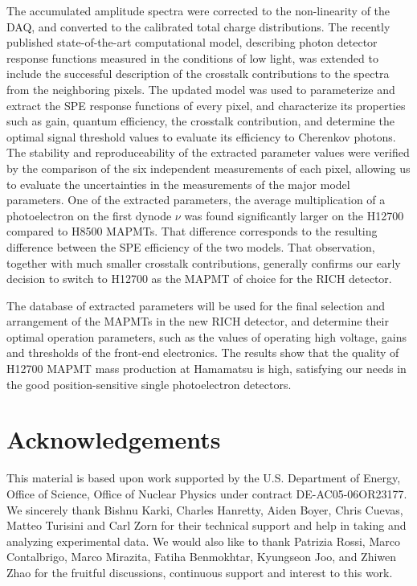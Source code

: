 The accumulated amplitude spectra were corrected to the non-linearity of the DAQ, and converted to the calibrated total charge distributions. The recently published state-of-the-art computational model, describing photon detector response functions measured in the conditions of low light, was extended to include the successful description of the crosstalk contributions to the spectra from the neighboring pixels. The updated model was used to parameterize and extract the SPE response functions of every pixel, and characterize its properties such as gain, quantum efficiency, the crosstalk contribution, and determine the optimal signal threshold values to evaluate its efficiency to Cherenkov photons. The stability and reproduceability of the extracted parameter values were verified by the comparison of the six independent measurements of each pixel, allowing us to evaluate the uncertainties in the measurements of the major model parameters. One of the extracted parameters, the average multiplication of a photoelectron on the first dynode $\nu$ was found significantly larger on the H12700 compared to H8500 MAPMTs. That difference corresponds to the resulting difference between the SPE efficiency of the two models.  That observation, together with much smaller crosstalk contributions, generally confirms our early decision to switch to H12700 as the MAPMT of choice for the RICH detector.

The database of extracted parameters will be used for the final selection and arrangement of the MAPMTs in the new RICH detector, and determine their optimal operation parameters, such as the values of operating high voltage, gains and thresholds of the front-end electronics. The results show that the quality of H12700 MAPMT mass production at Hamamatsu is high, satisfying our needs in the good position-sensitive single photoelectron detectors.



\section{Acknowledgements}
This material is based upon work supported by the U.S. Department of Energy, Office of Science, Office of Nuclear Physics under contract DE-AC05-06OR23177.
We sincerely thank 
Bishnu Karki,
Charles Hanretty,
Aiden Boyer,
Chris  Cuevas,
Matteo Turisini and
Carl Zorn
for their technical support and help in taking and analyzing experimental  data. We would
also like to thank 
Patrizia Rossi, 
Marco Contalbrigo, 
Marco Mirazita,
Fatiha Benmokhtar,
Kyungseon Joo,
and Zhiwen Zhao
for the fruitful discussions, continuous support and interest to this work.